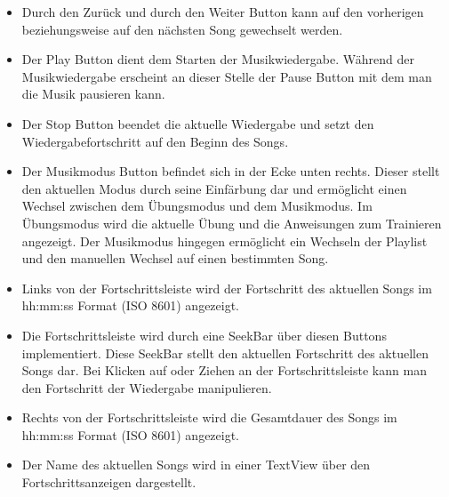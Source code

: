 \documentclass[FIPLY_base.tex]{subfiles}
\begin{document}
\begin{itemize}
\item Durch den Zurück und durch den Weiter Button kann auf den vorherigen beziehungsweise auf den nächsten Song gewechselt werden. 
\item Der Play Button dient dem Starten der Musikwiedergabe. \newline
Während der Musikwiedergabe erscheint an dieser Stelle der Pause Button mit dem man die Musik pausieren kann. 
\item Der Stop Button beendet die aktuelle Wiedergabe und setzt den Wiedergabefortschritt auf den Beginn des Songs. 
\item Der Musikmodus Button befindet sich in der Ecke unten rechts. \newline
Dieser stellt den aktuellen Modus durch seine Einfärbung dar und ermöglicht einen Wechsel zwischen dem Übungsmodus und dem Musikmodus.
Im Übungsmodus wird die aktuelle Übung und die Anweisungen zum Trainieren angezeigt. \newline
Der Musikmodus hingegen ermöglicht ein Wechseln der Playlist und den manuellen Wechsel auf einen bestimmten Song. 
\item Links von der Fortschrittsleiste wird der Fortschritt des aktuellen Songs im hh:mm:ss Format (ISO 8601) angezeigt. 
\item Die Fortschrittsleiste wird durch eine SeekBar über diesen Buttons implementiert. Diese SeekBar stellt den aktuellen Fortschritt des aktuellen Songs dar. \newline 
Bei Klicken auf oder Ziehen an der Fortschrittsleiste kann man den Fortschritt der Wiedergabe manipulieren. 
\item Rechts von der Fortschrittsleiste wird die Gesamtdauer des Songs im hh:mm:ss Format (ISO 8601) angezeigt.
\item Der Name des aktuellen Songs wird in einer TextView über den Fortschrittsanzeigen dargestellt.
\end{itemize}
\end{document}
